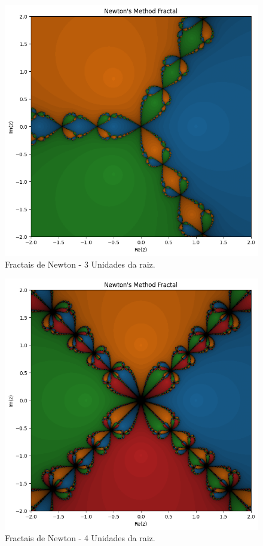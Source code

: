 \begin{figure}[H]
    \centering 
    \includegraphics[width=1\textwidth]{Imagens/nr2d_fractals/unit_roots/unitroot3.png}
    \caption{Fractais de Newton - 3 Unidades da raiz.}
    \label{fig:fractaisnr_unitroots3}
\end{figure}


\begin{figure}[H]
    \centering 
    \includegraphics[width=1\textwidth]{Imagens/nr2d_fractals/unit_roots/unitroot4.png}
    \caption{Fractais de Newton - 4 Unidades da raiz.}
    \label{fig:fractaisnr_unitroots4}
\end{figure}


